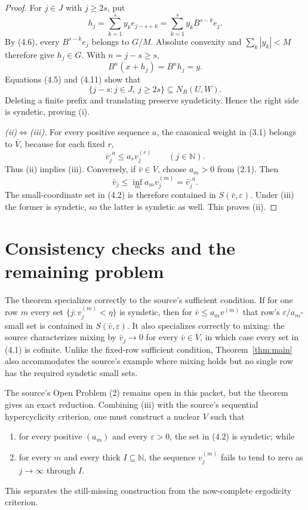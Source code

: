 \documentclass[11pt]{article}
\theoremstyle{remark}
\newcommand{\N}{\mathbb N}
\newcommand{\cV}{\overline V}
\begin{document}
\begin{proof}
For $j\in J$ with $j\geq2s$, put
\[
 h_j=\sum_{k=1}^s y_ke_{j-s+k}
     =\sum_{k=1}^s y_kB^{s-k}e_j.
 \tag{4.10}
\]
By (4.6), every $B^{s-k}e_j$ belongs to $G/M$.  Absolute convexity and
$\sum_k|y_k|<M$ therefore give $h_j\in G$.  With $n=j-s\geq s$,
\[
 B^n(x+h_j)=B^nh_j=y.
 \tag{4.11}
\]
Equations (4.5) and (4.11) show that
\[
 \{j-s:j\in J,\ j\geq2s\}\subseteq N_B(U,W).
\]
Deleting a finite prefix and translating preserve syndeticity.  Hence the
right side is syndetic, proving (i).

\emph{(ii)$\Leftrightarrow$(iii).}
For every positive sequence $a$, the canonical weight in (3.1) belongs to
$\cV$, because for each fixed $r$,
\[
 \bar v^{,a}_j\leq a_rv^{(r)}_j\qquad(j\in\N).
\]
Thus (ii) implies (iii).  Conversely, if $\bar v\in\cV$, choose $a_m>0$
from (2.1).  Then
\[
 \bar v_j\leq\inf_m a_mv^{(m)}_j=\bar v^{,a}_j.
 \tag{4.12}
\]
The small-coordinate set in (4.2) is therefore contained in
$S(\bar v,\varepsilon)$.  Under (iii) the former is syndetic, so the latter
is syndetic as well.  This proves (ii).
\end{proof}

\section{Consistency checks and the remaining problem}

The theorem specializes correctly to the source's sufficient condition.
If for one row $m$ every set
$\{j:v^{(m)}_j<\eta\}$ is syndetic, then for
$\bar v\leq a_mv^{(m)}$ that row's $\varepsilon/a_m$-small set is contained
in $S(\bar v,\varepsilon)$.  It also specializes correctly to mixing: the
source characterizes mixing by $\bar v_j\to0$ for every $\bar v\in\cV$, in
which case every set in (4.1) is cofinite.  Unlike the fixed-row sufficient
condition, Theorem~\ref{thm:main} also accommodates the source's example
where mixing holds but no single row has the required syndetic small sets.

The source's Open Problem (2) remains open in this packet, but the theorem
gives an exact reduction.  Combining (iii) with the source's sequential
hypercyclicity criterion, one must construct a nuclear $V$ such that
\begin{enumerate}
\item for every positive $(a_m)$ and every $\varepsilon>0$, the set in
(4.2) is syndetic; while
\item for every $m$ and every thick $I\subseteq\N$, the sequence
$v^{(m)}_j$ fails to tend to zero as $j\to\infty$ through $I$.
\end{enumerate}
This separates the still-missing construction from the now-complete
ergodicity criterion.
\end{document}
